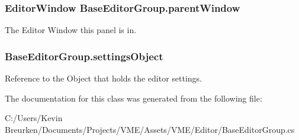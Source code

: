 \subsubsection[{\texorpdfstring{parent\+Window}{parentWindow}}]{\setlength{\rightskip}{0pt plus 5cm}Editor\+Window Base\+Editor\+Group.\+parent\+Window}\hypertarget{class_base_editor_group_ac811d2797fc68b5c51f34605228f0672}{}\label{class_base_editor_group_ac811d2797fc68b5c51f34605228f0672}


The Editor Window this panel is in. 

\subsubsection[{\texorpdfstring{settings\+Object}{settingsObject}}]{ Base\+Editor\+Group.\+settings\+Object}\hypertarget{class_base_editor_group_a8915a3a49694f1cfea5a17f9e6bccd16}{}\label{class_base_editor_group_a8915a3a49694f1cfea5a17f9e6bccd16}


Reference to the Object that holds the editor settings. 



The documentation for this class was generated from the following file\+:\begin{DoxyCompactItemize}
\item 
C\+:/\+Users/\+Kevin Breurken/\+Documents/\+Projects/\+V\+M\+E/\+Assets/\+V\+M\+E/\+Editor/Base\+Editor\+Group.\+cs\end{DoxyCompactItemize}
